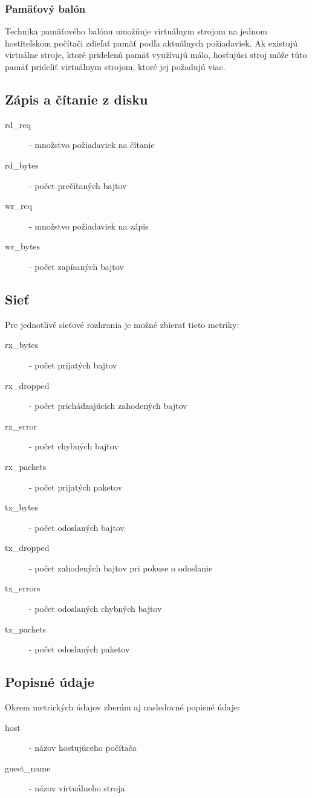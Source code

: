 \documentclass[printed,11pt,twoside,color,cover,table]{fithesis3}
\begin{document}
\subsubsection{Pamäťový balón}
Technika pamäťového balónu umožňuje virtuálnym strojom na jednom hostiteľskom počítači zdieľať pamäť podľa aktuálnych požiadaviek. 
Ak existujú virtuálne stroje, ktoré pridelenú pamäť využívajú málo,
hosťujúci stroj môže túto pamäť prideliť virtuálnym strojom, ktoré jej požadujú viac.

\subsection{Zápis a čítanie z disku}
\begin{description}
\item[rd\_req] - množstvo požiadaviek na čítanie
\item[rd\_bytes] - počet prečítaných bajtov
\item[wr\_req] - množstvo požiadaviek na zápis
\item[wr\_bytes] - počet zapísaných bajtov
\end{description}

\subsection{Sieť}
Pre jednotlivé sieťové rozhrania je možné zbierať tieto metriky:
\begin{description}
\item[rx\_bytes] - počet prijatých bajtov
\item[rx\_dropped] - počet prichádzajúcich zahodených bajtov
\item[rx\_error] - počet chybných bajtov
\item[rx\_packets] - počet prijatých paketov
\item[tx\_bytes] - počet odoslaných bajtov
\item[tx\_dropped] - počet zahodených bajtov pri pokuse o odoslanie
\item[tx\_errors] - počet odoslaných chybných bajtov
\item[tx\_packets] - počet odoslaných paketov
\end{description}

\subsection{Popisné údaje}
Okrem metrických údajov zberám aj nasledovné popisné údaje:
\begin{description}
\item[host] - názov hosťujúceho počítača
\item[guest\_name] - názov virtuálneho stroja
\end{description}
\end{document}
